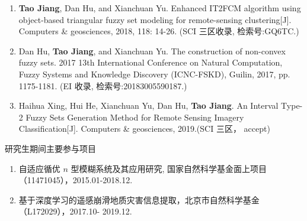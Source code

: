 \begin{paper}
\begin{enumerate}
  \item \textbf{Tao Jiang}, Dan Hu, and Xianchuan Yu.  Enhanced IT2FCM algorithm using object-based triangular fuzzy set modeling for remote-sensing clustering[J]. Computers \& geosciences, 2018, 118: 14-26. (SCI 三区收录, 检索号:GQ6TC.)
  \item Dan Hu, \textbf{Tao Jiang}, and Xianchuan Yu. The construction of non-convex fuzzy sets. 2017 13th International Conference on Natural Computation, Fuzzy Systems and Knowledge  Discovery (ICNC-FSKD), Guilin, 2017, pp. 1175-1181. (EI 收录, 检索号:20183005590187.)
  \item Haihua Xing, Hui He, Xianchuan Yu, Dan Hu, \textbf{Tao Jiang}.  An Interval Type-2 Fuzzy Sets Generation Method for Remote Sensing Imagery Classification[J]. Computers \& geosciences, 2019.(SCI 三区， accept) \\
  \end{enumerate}  

\end{paper}





\begin{center}
  \large {\hei 研究生期间主要参与项目 }
\end{center}

\begin{enumerate}[(1)]
\item 自适应循优 $n$ 型模糊系统及其应用研究, 国家自然科学基金面上项目（11471045），2015.01-2018.12.

\item 基于深度学习的遥感崩滑地质灾害信息提取，北京市自然科学基金（L172029），2017.10-
2019.12.\\

\end{enumerate}

